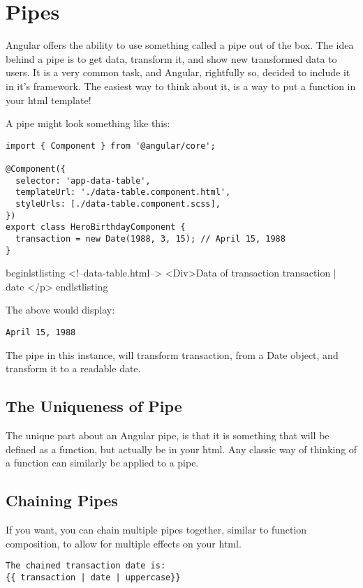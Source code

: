 \chapter{ Pipes }


Angular offers the ability to use something called a pipe out of the box. The
idea behind a pipe is to get data, transform it, and show new transformed data
to users. It is a very common task, and Angular, rightfully so, decided to
include it in it's framework. The easiest way to think about it, is a way
to put a function in your html template!

A pipe might look something like this:

\begin{lstlisting}
import { Component } from '@angular/core';

@Component({
  selector: 'app-data-table',
  templateUrl: './data-table.component.html',
  styleUrls: [./data-table.component.scss],
})
export class HeroBirthdayComponent {
  transaction = new Date(1988, 3, 15); // April 15, 1988
}
\end{lstlisting}

begin{lstlisting}
<!--data-table.html-->
<Div>Data of transaction {{ transaction | date }}</p>
end{lstlisting}

The above would display:
\begin{verbatim}
April 15, 1988
\end{verbatim}

The pipe in this instance, will transform transaction, from a Date object, and
transform it to a readable date.

\section{ The Uniqueness of Pipe }
The unique part about an Angular pipe, is that it is something that will be
defined as a function, but actually be in your html. Any classic way of
thinking of a function can similarly be applied to a pipe.

\section{Chaining Pipes}
If you want, you can chain multiple pipes together, similar to function
composition, to allow for multiple effects on your html.

\begin{lstlisting}
The chained transaction date is:
{{ transaction | date | uppercase}}
\end{lstlisting}

